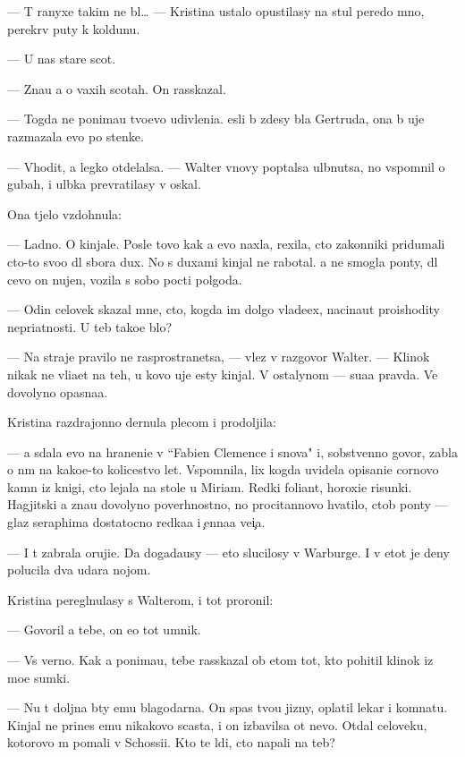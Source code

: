 \documentclass[10pt]{book}
\begin{document}
— T{\yi} ranyxe takim ne b{\yi}l… — Kristina ustalo opustilasy na stul peredo mno{\y}, perekr{\yi}v puty k koldunu.

— U nas star{\yi}{\y}e scot{\yi}.

— Zna{\y}u {\y}a o vaxih scotah. On rasskazal.

— Togda ne ponima{\y}u tvo{\y}evo udivleni{\y}a. {\Y}esli b{\yi} zdesy b{\yi}la Gertruda, ona b{\yi} uje razmazala {\y}evo po stenke.

— V{\yi}hodit, {\y}a legko otdelalsa. — Walter vnovy pop{\yi}talsa ul{\yi}bnutsa, no vspomnil o gubah, i ul{\yi}bka prevratilasy v oskal.

Ona t{\ia}jelo vzdohnula:

— Ladno. O kinjale. Posle tovo kak {\y}a {\y}evo naxla, rexila, cto zakonniki pridumali cto-to svo{\y}o dl{\ia} sbora dux. No s duxami kinjal ne rabotal. {\Y}a ne smogla pon{\ia}ty, dl{\ia} cevo on nujen, vozila s sobo{\y} pocti polgoda.

— Odin celovek skazal mne, cto, kogda im dolgo vlade{\y}ex, nacina{\y}ut proishodity nepri{\y}atnosti. U teb{\ia} tako{\y}e b{\yi}lo?

— Na straje{\y} pravilo ne rasprostran{\ia}{\y}etsa, — vlez v razgovor Walter. — Klinok nikak ne vli{\y}a{\y}et na teh, u kovo uje {\y}esty kinjal{\yi}. V ostalynom — su{\x}a{\y}a pravda. Ve{\x} dovolyno opasna{\y}a.

Kristina razdrajonno dernula plecom i prodoljila:

— {\Y}a sdala {\y}evo na hraneni{\y}e v ``Fabien Clemence i s{\yi}nov{\y}a" i, sobstvenno govor{\ia}, zab{\yi}la o n{\e}m na kako{\y}e-to kolicestvo let. Vspomnila, lix kogda uvidela opisani{\y}e cornovo kamn{\ia} iz knigi, cto lejala na stole u Miriam. Redki{\y} foliant, horoxi{\y}e risunki. Hagjitski{\y} {\y}a zna{\y}u dovolyno poverhnostno, no procitannovo hvatilo, ctob{\yi} pon{\ia}ty — glaz seraphima dostatocno redka{\y}a i {\c}enna{\y}a ve{\x}i{\c}a.

— I t{\yi} zabrala oruji{\y}e. Da{\y} dogada{\y}usy — eto slucilosy v Warburge. I v etot je deny polucila dva udara nojom.

Kristina peregl{\ia}nulasy s Walterom, i tot proronil:

— Govoril {\y}a tebe, on {\y}e{\x}o tot umnik.

— Vs{\e} verno. Kak {\y}a ponima{\y}u, tebe rasskazal ob etom tot, kto pohitil klinok iz mo{\y}e{\y} sumki.

— Nu t{\yi} doljna b{\yi}ty {\y}emu blagodarna. On spas tvo{\y}u jizny, oplatil lekar{\ia} i komnatu. Kinjal ne prines {\y}emu nikakovo scast{\y}a, i on izbavilsa ot nevo. Otdal celoveku, kotorovo m{\yi} po{\y}mali v Schossi{\y}i. Kto te l{\io}di, cto napali na teb{\ia}?
\end{document}
